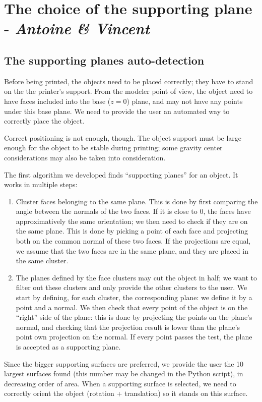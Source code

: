 \documentclass{report}
\begin{document}
\section{The choice of the supporting plane - \textit{Antoine \& Vincent}}

\subsection{The supporting planes auto-detection}
Before being printed, the objects need to be placed correctly; they have to stand on the the printer’s support. From the modeler point of view, the object need to have faces included into the base ($z = 0$) plane, and may not have any points under this base plane. We need to provide the user an automated way to correctly place the object.

Correct positioning is not enough, though. The object support must be large enough for the object to be stable during printing; some gravity center considerations may also be taken into consideration.

The first algorithm we developed finds “supporting planes” for an object. It works in multiple steps:
\begin{enumerate}
\item Cluster faces belonging to the same plane. This is done by first comparing the angle between the normals of the two faces. If it is close to $0$, the faces have approximatively the same orientation; we then need to check if they are on the same plane. This is done by picking a point of each face and projecting both on the common normal of these two faces. If the projections are equal, we assume that the two faces are in the same plane, and they are placed in the same cluster.
\item The planes defined by the face clusters may cut the object in half; we want to filter out these clusters and only provide the other clusters to the user. We start by defining, for each cluster, the corresponding plane: we define it by a point and a normal. We then check that every point of the object is on the “right” side of the plane: this is done by projecting the points on the plane’s normal, and checking that the projection result is lower than the plane’s point own projection on the normal. If every point passes the test, the plane is accepted as a supporting plane.
\end{enumerate}

Since the bigger supporting surfaces are preferred, we provide the user the 10 largest surfaces found (this number may be changed in the Python script), in decreasing order of area. When a supporting surface is selected, we need to correctly orient the object (rotation + translation) so it stands on this surface.
\end{document}
